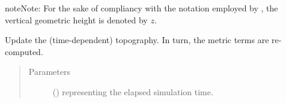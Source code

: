 \documentclass[letterpaper,10pt,english]{sphinxmanual}
\begin{document}
\begin{fulllineitems}
\begin{fulllineitems}
\begin{quote}
\begin{description}
\end{description}\end{quote}

\begin{sphinxadmonition}{note}{Note:}
For the sake of compliancy with the notation employed by ,
the vertical geometric height is denoted by \(z\).
\end{sphinxadmonition}

\end{fulllineitems}


\begin{fulllineitems}
\label{\detokenize{api:grids.sigma.Sigma2d.update_topography}}
Update the (time-dependent) topography. In turn, the metric terms are re-computed.
\begin{quote}\begin{description}
\item[{Parameters}] \leavevmode
{} () \textendash{}  representing the elapsed simulation time.

\end{description}\end{quote}

\end{fulllineitems}


\end{fulllineitems}

\end{document}
